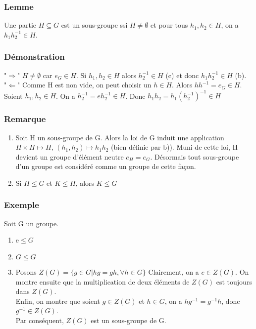 \documentclass[a4paper, oneside]{report}
\newcommand{\x}{\times}
\begin{document}
\subsubsection{Lemme}
Une partie $H\subseteq G$ est un sous-groupe ssi $H\neq \emptyset$ et pour tous $h_1,h_2\in H$, on a $h_1h_2^{-1}\in H$.

\subsubsection{Démonstration}
"$\Rightarrow$" $H\neq \emptyset$ car $e_G \in H$. Si $h_1,h_2\in H$ alors $h_2^{-1}\in H$ (c) et donc $h_1h_2^{-1}\in H$ (b).\\
"$\Leftarrow$" Comme H est non vide, on peut choisir un $h\in H$. Alors $hh^{-1}=e_G \in H$. Soient $h_1,h_2 \in H$. On a $h_2^{-1}=eh_2^{-1}\in H$. Donc $h_1h_2=h_1(h_2^{-1})^{-1}\in H$

\subsubsection{Remarque}

\begin{enumerate}
\item Soit H un sous-groupe de G. Alors la loi de G induit une application $H\x H \mapsto H$, $(h_1,h_2)\mapsto h_1h_2$ (bien définie par b)). Muni de cette loi, H devient un groupe d'élément neutre $e_H=e_G$. Désormais tout sous-groupe d'un groupe est considéré comme un groupe de cette façon.
\item Si $H\leq G$ et $K\leq H$, alors $K\leq G$

\end{enumerate}


\subsubsection{Exemple}
Soit G un groupe.

\begin{enumerate}
\item {e}$\leq G$
\item $G\leq G$
\item Posons $Z(G)=\{g\in G | hg=gh, \forall h\in G \}$
Clairement, on a $e\in Z(G)$. On montre ensuite que la multiplication de deux éléments de $Z(G)$ est toujours dans $Z(G)$.\\
Enfin, on montre que soient $g\in Z(G)$ et $h\in G$, on a $hg^{-1}=g^{-1}h$, donc $g^{-1}\in Z(G)$.\\
Par conséquent, $Z(G)$ est un sous-groupe de G.
\end{enumerate}
\end{document}
